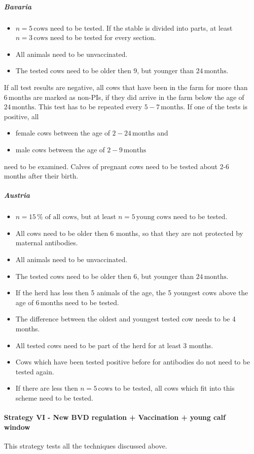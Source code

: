 \subparagraph{Bavaria}
\begin{itemize}
\item $n = 5\,\text{cows}$ need to be tested. If the stable is divided into parts, at least $n = 3\,\text{cows}$ need to be tested for every section. 
\item All animals need to be unvaccinated.
\item The tested cows need to be older then 9, but younger than $24\,\text{months}$.
\end{itemize}
If all test results are negative, all cows that have been in the farm for more than $6\,\text{months}$ are marked as non-PIs, if they did arrive in the farm below the age of $24\,\text{months}$. This test has to be repeated every $5-7\,\text{months}$.
If one of the tests is positive, all 
\begin{itemize}
\item female cows between the age of $2-24\,\text{months}$ and
\item male cows between the age of $2-9\,\text{months}$
\end{itemize}
need to be examined. Calves of pregnant cows need to be tested about 2-6 months after their birth.
\subparagraph{Austria}
\begin{itemize}
\item $n = 15\,\%\text{ of all cows}$, but at least $n = 5\,\text{young cows}$ need to be tested.
\item All cows need to be older then 6 months, so that they are not protected by maternal antibodies.
\item All animals need to be unvaccinated.
\item The tested cows need to be older then 6, but younger than $24\,\text{months}$.
\item If the herd has less then 5 animals of the age, the 5 youngest cows above the age of $6\,\text{months}$  need to be tested.
\item The difference between the oldest and youngest tested cow needs to be 4 months. 
\item All tested cows need to be part of the herd for at least 3 months.
\item Cows which have been tested positive before for antibodies do not need to be tested again.
\item If there are less then $n = 5\,\text{cows}$ to be tested, all cows which fit into this scheme need to be tested.
\end{itemize}
\paragraph{Strategy VI - New BVD regulation + Vaccination + young calf window} 
This strategy tests all the techniques discussed above.
